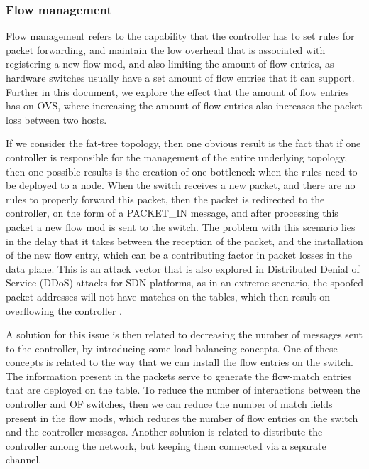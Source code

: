 \subsubsection {Flow management}

Flow management refers to the capability that the controller has to set rules for packet forwarding, and maintain the low overhead that is associated with registering a new flow mod, and also limiting the amount of flow entries, 
as hardware switches usually have a set amount of flow entries that it can support. Further in this document, we explore the effect that the amount of flow entries has on OVS, where increasing the amount of flow entries also 
increases the packet loss between two hosts.
\par If we consider the fat-tree topology, then one obvious result is the fact that if one controller is responsible for the management of the entire underlying topology, then one possible results is the creation of one bottleneck
when the rules need to be deployed to a node. When the switch receives a new packet, and there are no rules to properly forward this packet, then the packet is redirected to the controller, on the form of a \textsc{PACKET\_IN} 
message, and after processing this packet a new flow mod is sent to the switch. The problem with this scenario lies in the delay that it takes between the reception of the packet, and the installation of the new
flow entry, which can be a contributing factor in packet losses in the data plane. This is an attack vector that is also explored in Distributed Denial of Service (DDoS) attacks for SDN platforms, as in an extreme scenario,
the spoofed packet addresses will not have matches on the tables, which then result on overflowing the controller \cite {early_detection_sdn_ddos}.
\par A solution for this issue is then related to decreasing the number of messages sent to the controller, by introducing some load balancing concepts. One of these concepts is related to the way that we can install the flow 
entries on the switch. The information present in the packets serve to generate the flow-match entries that are deployed on the table. To reduce the number of interactions between the controller and OF switches, then we can 
reduce the number of match fields present in the flow mods, which reduces the number of flow entries on the switch and the controller messages. Another solution is related to distribute the controller among the network, 
but keeping them connected via a separate channel.

